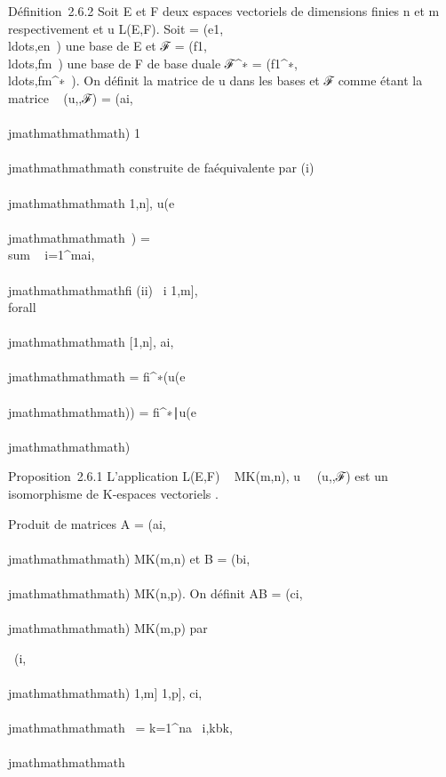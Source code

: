 Définition~2.6.2 Soit E et F deux espaces vectoriels de dimensions
finies n et m respectivement et u \in L(E,F). Soit  =
(e1,\\ldots,en~)
une base de E et ℱ =
(f1,\\ldots,fm~)
une base de F de base duale ℱ^∗ =
(f1^∗,\\ldots,fm^∗~).
On définit la matrice de u dans les bases  et ℱ comme étant la matrice
\mathrmMat~ (u,,ℱ) =
(ai,\\\\jmathmathmathmath) 1\leqi\leqm {}\leq\\\\jmathmathmathmath\leqn 
construite de fa\ccon équivalente par (i)
\forall~\\\\jmathmathmathmath \in {[}1,n{]}, u(e\\\\jmathmathmathmath~)
= \\sum ~
i=1^mai,\\\\jmathmathmathmathfi (ii)
\forall~i \in {[}1,m{]}, \\forall~~\\\\jmathmathmathmath \in
{[}1,n{]}, ai,\\\\jmathmathmathmath = fi^∗(u(e\\\\jmathmathmathmath))
=\langle
fi^∗∣u(e\\\\jmathmathmathmath)\rangle

Proposition~2.6.1 L'application L(E,F) \rightarrow~ MK(m,n),
u\mapsto~\mathrmMat~
(u,,ℱ) est un isomorphisme de K-espaces vectoriels .

Produit de matrices A = (ai,\\\\jmathmathmathmath) \in MK(m,n) et B =
(bi,\\\\jmathmathmathmath) \in MK(n,p). On définit AB = (ci,\\\\jmathmathmathmath) \in
MK(m,p) par

\forall~(i,\\\\jmathmathmathmath) \in {[}1,m{]} \times {[}1,p{]}, ci,\\\\jmathmathmathmath~
= \sum k=1^na~
i,kbk,\\\\jmathmathmathmath

